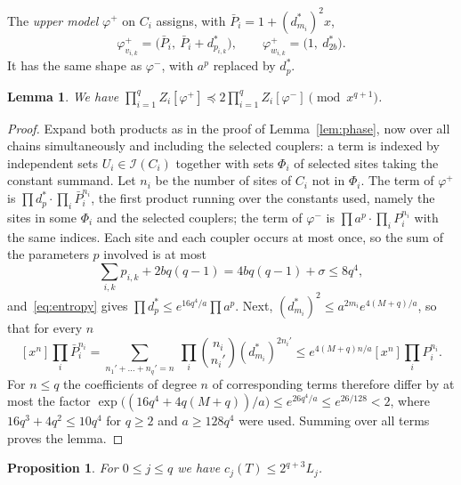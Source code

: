 \documentclass[11pt]{amsart}
\newtheorem{lemma}[theorem]{Lemma}
\newtheorem{proposition}[theorem]{Proposition}
\theoremstyle{definition}
\theoremstyle{remark}
\numberwithin{equation}{section}
\newcommand{\cI}{\mathcal{I}}
\newcommand{\coef}[2]{[x^{#1}]#2}
\begin{document}
The \emph{upper model} $\varphi^+$ on $C_i$ assigns, with $\bar P_i=1+(d^\ast_{m_i})^2x$,
\[
\varphi^+_{v_{i,k}}=\bigl(\bar P_i,\ \bar P_i+d^\ast_{p_{i,k}}\bigr),\qquad\varphi^+_{w_{i,k}}=\bigl(1,\ d^\ast_{2b}\bigr).
\]
It has the same shape as $\varphi^-$, with $a^p$ replaced by $d^\ast_p$.

\begin{lemma}\label{lem:models}
We have $\prod_{i=1}^qZ_i[\varphi^+]\preceq2\prod_{i=1}^qZ_i[\varphi^-]\pmod{x^{q+1}}$.
\end{lemma}

\begin{proof}
Expand both products as in the proof of Lemma~\ref{lem:phase}, now over all chains simultaneously and including the selected couplers: a term is indexed by independent sets $U_i\in\cI(C_i)$ together with sets $\Phi_i$ of selected sites taking the constant summand. Let $n_i$ be the number of sites of $C_i$ not in $\Phi_i$. The term of $\varphi^+$ is $\prod d^\ast_p\cdot\prod_i\bar P_i^{n_i}$, the first product running over the constants used, namely the sites in some $\Phi_i$ and the selected couplers; the term of $\varphi^-$ is $\prod a^p\cdot\prod_iP_i^{n_i}$ with the same indices. Each site and each coupler occurs at most once, so the sum of the parameters $p$ involved is at most
\[
\sum_{i,k}p_{i,k}+2bq(q-1)=4bq(q-1)+\sigma\le8q^4,
\]
and~\eqref{eq:entropy} gives $\prod d^\ast_p\le e^{16q^4/a}\prod a^p$. Next, $(d^\ast_{m_i})^2\le a^{2m_i}e^{4(M+q)/a}$, so that for every $n$
\[
\coef n{\prod_i\bar P_i^{n_i}}=\sum_{n_1'+\dots+n_q'=n}\ \prod_i\binom{n_i}{n_i'}(d^\ast_{m_i})^{2n_i'}\le e^{4(M+q)n/a}\coef n{\prod_iP_i^{n_i}}.
\]
For $n\le q$ the coefficients of degree $n$ of corresponding terms therefore differ by at most the factor $\exp\bigl((16q^4+4q(M+q))/a\bigr)\le e^{26q^4/a}\le e^{26/128}<2$, where $16q^3+4q^2\le10q^4$ for $q\ge2$ and $a\ge128q^4$ were used. Summing over all terms proves the lemma.
\end{proof}

\begin{proposition}\label{prop:upper}
For $0\le j\le q$ we have $c_j(T)\le2^{q+3}L_j$.
\end{proposition}
\end{document}
